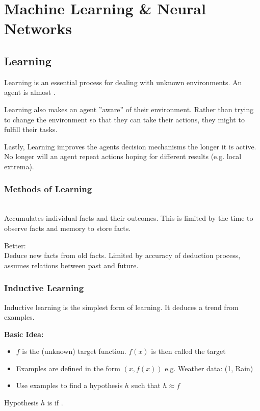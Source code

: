 \documentclass[
../../EiKI_Summary.tex,
]
{subfiles}
\begin{document}
\section{Machine Learning \& Neural Networks}
\subsection{Learning}
Learning is an essential process for dealing with unknown environments. An agent is almost .

Learning also makes an agent ''aware'' of their environment. Rather than trying to change the environment so that they can take their actions, they might  to fulfill their tasks.

Lastly, Learning improves the agents decision mechanisms the longer it is active. No longer will an agent repeat actions hoping for different results (e.g. local extrema).

\subsubsection{Methods of Learning}
\\
Accumulates individual facts and their outcomes. This is limited by the time to observe facts and memory to store facts.

Better: \\
Deduce new facts from old facts. Limited by accuracy of deduction process, assumes relations between past and future.

\subsubsection{Inductive Learning}
Inductive learning is the simplest form of learning. It deduces a trend from examples.

\textbf{Basic Idea:}
\begin{itemize}
    \item $f$ is the (unknown) target function. $f(x)$ is then called the target
    \item Examples are defined in the form $(x,f(x))$ e.g. Weather data: (1, Rain)
    \item Use examples to find a hypothesis $h$ such that $h \approx f$
\end{itemize}

Hypothesis $h$ is  if .
\end{document}
